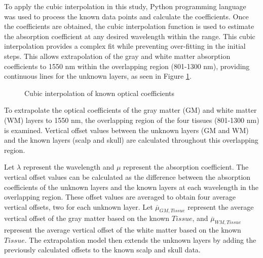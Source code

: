 \documentclass[journal,twoside,web]{ieeecolor}
\begin{document}
To apply the cubic interpolation in this study, Python programming language was used to process the known data points and calculate the coefficients. 
Once the coefficients are obtained, the cubic interpolation function is used to estimate the absorption coefficient at any desired wavelength within the range. 
This cubic interpolation provides a complex fit while preventing over-fitting in the initial steps. This allows extrapolation of the gray and white matter 
absorption coefficients to 1550 nm within the overlapping region (801-1300 nm), providing continuous lines for the unknown layers, as seen in Figure \ref{fig:Known}.

\begin{figure}[!htb]
    \caption{\label{fig:Known} Cubic interpolation of known optical coefficients}
\end{figure}

To extrapolate the optical coefficients of the gray matter (GM) and white matter (WM) layers to 1550 nm, the overlapping region of the four tissues 
(801-1300 nm) is examined. Vertical offset values between the unknown layers (GM and WM) and the known layers (scalp and skull) are calculated throughout 
this overlapping region.

Let \( \lambda \) represent the wavelength and \( \mu \) represent the absorption coefficient. The vertical offset values can be calculated as the 
difference between the absorption coefficients of the unknown layers and the known layers at each wavelength in the overlapping region. 
These offset values are averaged to obtain four average vertical offsets, two for each unknown layer. Let $\overline{\mu}_{GM, Tissue}$ represent the 
average vertical offset of the gray matter based on the known $Tissue$, and $\overline{\mu}_{WM, Tissue}$ represent the average vertical offset of the white 
matter based on the known $Tissue$. The extrapolation model then extends the unknown layers by adding the previously calculated offsets to the known scalp 
and skull data.
\end{document}
